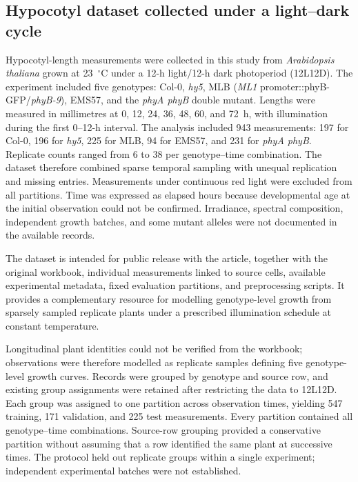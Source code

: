 \subsection{Hypocotyl dataset collected under a light--dark cycle}
\label{subsec:hypocotyldata}

Hypocotyl-length measurements were collected in this study from \textit{Arabidopsis thaliana} grown at 23~$^{\circ}$C under a 12-h light/12-h dark photoperiod (12L12D). The experiment included five genotypes: Col-0, \textit{hy5}, MLB (\textit{ML1} promoter::phyB-GFP/\textit{phyB-9}), EMS57, and the \textit{phyA phyB} double mutant. Lengths were measured in millimetres at 0, 12, 24, 36, 48, 60, and 72~h, with illumination during the first 0--12-h interval. The analysis included 943 measurements: 197 for Col-0, 196 for \textit{hy5}, 225 for MLB, 94 for EMS57, and 231 for \textit{phyA phyB}. Replicate counts ranged from 6 to 38 per genotype--time combination. The dataset therefore combined sparse temporal sampling with unequal replication and missing entries. Measurements under continuous red light were excluded from all partitions. Time was expressed as elapsed hours because developmental age at the initial observation could not be confirmed. Irradiance, spectral composition, independent growth batches, and some mutant alleles were not documented in the available records.

The dataset is intended for public release with the article, together with the original workbook, individual measurements linked to source cells, available experimental metadata, fixed evaluation partitions, and preprocessing scripts. It provides a complementary resource for modelling genotype-level growth from sparsely sampled replicate plants under a prescribed illumination schedule at constant temperature.

Longitudinal plant identities could not be verified from the workbook; observations were therefore modelled as replicate samples defining five genotype-level growth curves. Records were grouped by genotype and source row, and existing group assignments were retained after restricting the data to 12L12D. Each group was assigned to one partition across observation times, yielding 547 training, 171 validation, and 225 test measurements. Every partition contained all genotype--time combinations. Source-row grouping provided a conservative partition without assuming that a row identified the same plant at successive times. The protocol held out replicate groups within a single experiment; independent experimental batches were not established.

